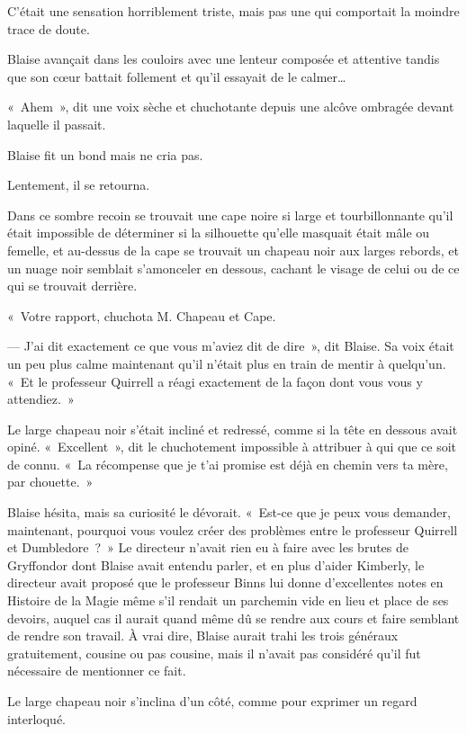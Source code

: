 C'était une sensation horriblement triste, mais pas une qui comportait la moindre trace de doute.


Blaise avançait dans les couloirs avec une lenteur composée et attentive tandis que son cœur battait follement et qu'il essayait de le calmer…

«~Ahem~», dit une voix sèche et chuchotante depuis une alcôve ombragée devant laquelle il passait.

Blaise fit un bond mais ne cria pas.

Lentement, il se retourna.

Dans ce sombre recoin se trouvait une cape noire si large et tourbillonnante qu'il était impossible de déterminer si la silhouette qu'elle masquait était mâle ou femelle, et au-dessus de la cape se trouvait un chapeau noir aux larges rebords, et un nuage noir semblait s'amonceler en dessous, cachant le visage de celui ou de ce qui se trouvait derrière.

«~Votre rapport, chuchota M. Chapeau et Cape.

--- J'ai dit exactement ce que vous m'aviez dit de dire~», dit Blaise.
Sa voix était un peu plus calme maintenant qu'il n'était plus en train de mentir à quelqu'un.
«~Et le professeur Quirrell a réagi exactement de la façon dont vous vous y attendiez.~»

Le large chapeau noir s'était incliné et redressé, comme si la tête en dessous avait opiné.
«~Excellent~», dit le chuchotement impossible à attribuer à qui que ce soit de connu.
«~La récompense que je t'ai promise est déjà en chemin vers ta mère, par chouette.~»

Blaise hésita, mais sa curiosité le dévorait.
«~Est-ce que je peux vous demander, maintenant, pourquoi vous voulez créer des problèmes entre le professeur Quirrell et Dumbledore~?~»
Le directeur n'avait rien eu à faire avec les brutes de Gryffondor dont Blaise avait entendu parler, et en plus d'aider Kimberly, le directeur avait proposé que le professeur Binns lui donne d'excellentes notes en Histoire de la Magie même s'il rendait un parchemin vide en lieu et place de ses devoirs, auquel cas il aurait quand même dû se rendre aux cours et faire semblant de rendre son travail.
À vrai dire, Blaise aurait trahi les trois généraux gratuitement, cousine ou pas cousine, mais il n'avait pas considéré qu'il fut nécessaire de mentionner ce fait.

Le large chapeau noir s'inclina d'un côté, comme pour exprimer un regard interloqué.

